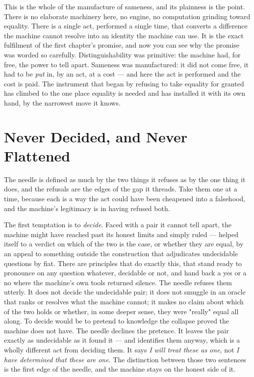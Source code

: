 This is the whole of the manufacture of sameness, and its plainness is the point. There is no elaborate machinery
here, no engine, no computation grinding toward equality. There is a single act, performed a single time, that
converts a difference the machine cannot resolve into an identity the machine can use. It is the exact fulfilment
of the first chapter's promise, and now you can see why the promise was worded so carefully. Distinguishability
was primitive: the machine had, for free, the power to tell apart. Sameness was manufactured: it did not come
free, it had to be \emph{put} in, by an act, at a cost --- and here the act is performed and the cost is paid. The
instrument that began by refusing to take equality for granted has climbed to the one place equality is needed
and has installed it with its own hand, by the narrowest move it knows.

\section{Never Decided, and Never Flattened}

The needle is defined as much by the two things it refuses as by the one thing it does, and the refusals are the
edges of the gap it threads. Take them one at a time, because each is a way the act could have been cheapened into
a falsehood, and the machine's legitimacy is in having refused both.

The first temptation is to \emph{decide}. Faced with a pair it cannot tell apart, the machine might have reached
past its honest limits and simply ruled --- helped itself to a verdict on which of the two is the case, or whether
they are equal, by an appeal to something outside the construction that adjudicates undecidable questions by fiat.
There are principles that do exactly this, that stand ready to pronounce on any question whatever, decidable or
not, and hand back a yes or a no where the machine's own tools returned silence. The needle refuses them utterly.
It does not decide the undecidable pair; it does not smuggle in an oracle that ranks or resolves what the machine
cannot; it makes no claim about which of the two holds or whether, in some deeper sense, they were "really" equal
all along. To decide would be to pretend to knowledge the collapse proved the machine does not have. The needle
declines the pretence. It leaves the pair exactly as undecidable as it found it --- and identifies them anyway,
which is a wholly different act from deciding them. It says \emph{I will treat these as one}, not \emph{I have
determined that these are one}. The distinction between those two sentences is the first edge of the needle, and
the machine stays on the honest side of it.

